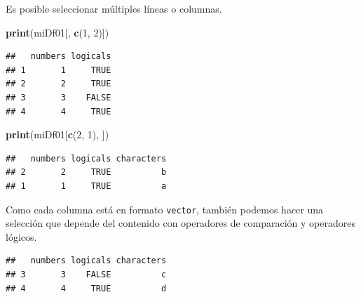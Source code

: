 \documentclass[]{book}
\newenvironment{Shaded}{\begin{snugshade}}{\end{snugshade}}
\newcommand{\KeywordTok}[1]{\textcolor[rgb]{0.13,0.29,0.53}{\textbf{#1}}}
\newcommand{\DecValTok}[1]{\textcolor[rgb]{0.00,0.00,0.81}{#1}}
\newcommand{\StringTok}[1]{\textcolor[rgb]{0.31,0.60,0.02}{#1}}
\newcommand{\OtherTok}[1]{\textcolor[rgb]{0.56,0.35,0.01}{#1}}
\newcommand{\OperatorTok}[1]{\textcolor[rgb]{0.81,0.36,0.00}{\textbf{#1}}}
\newcommand{\NormalTok}[1]{#1}
\begin{document}
Es posible seleccionar múltiples líneas o columnas.

\begin{Shaded}
\begin{Highlighting}[]
\KeywordTok{print}\NormalTok{(miDf01[, }\KeywordTok{c}\NormalTok{(}\DecValTok{1}\NormalTok{, }\DecValTok{2}\NormalTok{)])}
\end{Highlighting}
\end{Shaded}

\begin{verbatim}
##   numbers logicals
## 1       1     TRUE
## 2       2     TRUE
## 3       3    FALSE
## 4       4     TRUE
\end{verbatim}

\begin{Shaded}
\begin{Highlighting}[]
\KeywordTok{print}\NormalTok{(miDf01[}\KeywordTok{c}\NormalTok{(}\DecValTok{2}\NormalTok{, }\DecValTok{1}\NormalTok{), ])}
\end{Highlighting}
\end{Shaded}

\begin{verbatim}
##   numbers logicals characters
## 2       2     TRUE          b
## 1       1     TRUE          a
\end{verbatim}

Como cada columna está en formato \texttt{vector}, también podemos hacer
una selección que depende del contenido con operadores de comparación y
operadores lógicos.

\begin{Shaded}
\end{Shaded}

\begin{verbatim}
##   numbers logicals characters
## 3       3    FALSE          c
## 4       4     TRUE          d
\end{verbatim}

\begin{Shaded}
\end{Shaded}
\end{document}
